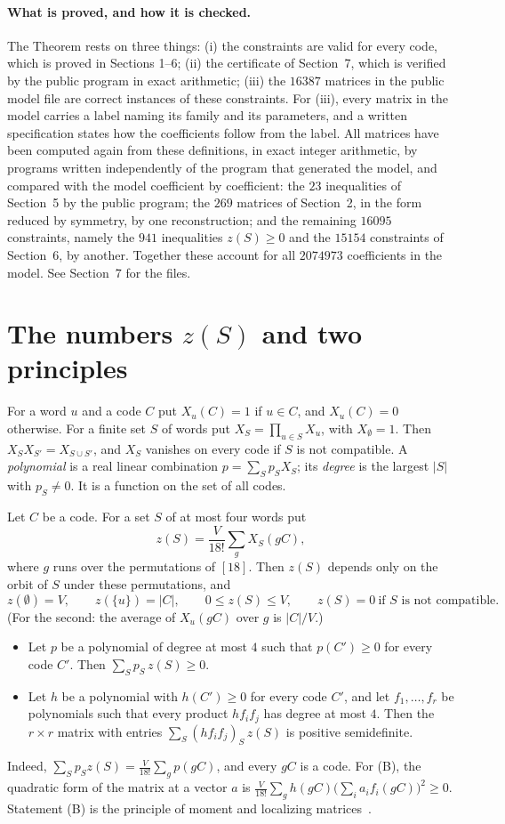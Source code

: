 \documentclass[11pt,a4paper]{article}
\newcommand{\abs}[1]{\lvert #1\rvert}
\begin{document}
\paragraph{What is proved, and how it is checked.}
The Theorem rests on three things: (i) the constraints are valid for every
code, which is proved in Sections 1--6; (ii) the certificate of Section~7,
which is verified by the public program in exact arithmetic; (iii) the
$16387$ matrices in the public model file are correct instances of these
constraints. For (iii), every matrix in the model carries a label naming
its family and its parameters, and a written specification states how the
coefficients follow from the label. All matrices have been computed again
from these definitions, in exact integer arithmetic, by programs written
independently of the program that generated the model, and compared with
the model coefficient by coefficient: the $23$ inequalities of Section~5 by
the public program; the $269$ matrices of Section~2, in the form reduced
by symmetry, by one reconstruction; and the remaining $16095$ constraints,
namely the $941$ inequalities $z(S)\ge 0$ and the $15154$ constraints of
Section~6, by another. Together these
account for all $2074973$ coefficients in the model. See Section~7 for the
files.

\section{The numbers $z(S)$ and two principles}

For a word $u$ and a code $C$ put $X_u(C)=1$ if $u\in C$, and $X_u(C)=0$
otherwise. For a finite set $S$ of words put $X_S=\prod_{u\in S}X_u$, with
$X_\emptyset=1$. Then $X_SX_{S'}=X_{S\cup S'}$, and $X_S$ vanishes on every
code if $S$ is not compatible. A \emph{polynomial} is a real linear
combination $p=\sum_S p_SX_S$; its \emph{degree} is the largest $\abs S$
with $p_S\ne 0$. It is a function on the set of all codes.

Let $C$ be a code. For a set $S$ of at most four words put
\[
z(S)=\frac{V}{18!}\sum_{g}X_S(gC),
\]
where $g$ runs over the permutations of $[18]$. Then $z(S)$ depends only on
the orbit of $S$ under these permutations, and
\[
z(\emptyset)=V,\qquad z(\{u\})=\abs C,\qquad 0\le z(S)\le V,\qquad
z(S)=0\ \text{if $S$ is not compatible.}
\]
(For the second: the average of $X_u(gC)$ over $g$ is $\abs C/V$.)

\begin{itemize}
\item[(A)] Let $p$ be a polynomial of degree at most $4$ such that
$p(C')\ge 0$ for every code $C'$. Then $\sum_Sp_S\,z(S)\ge 0$.
\item[(B)] Let $h$ be a polynomial with $h(C')\ge 0$ for every code $C'$,
and let $f_1,\dots,f_r$ be polynomials such that every product $hf_if_j$
has degree at most $4$. Then the $r\times r$ matrix with entries
$\sum_S(hf_if_j)_S\,z(S)$ is positive semidefinite.
\end{itemize}
Indeed, $\sum_Sp_Sz(S)=\frac{V}{18!}\sum_gp(gC)$, and every $gC$ is a code.
For (B), the quadratic form of the matrix at a vector $a$ is
$\frac V{18!}\sum_g h(gC)\bigl(\sum_ia_if_i(gC)\bigr)^2\ge 0$. Statement (B)
is the principle of moment and localizing matrices~\cite{Las}.
\end{document}
